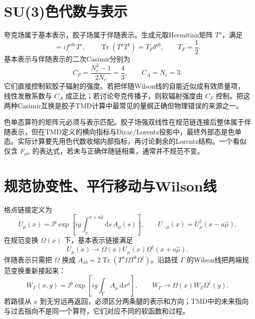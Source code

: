 \documentclass[UTF8,12pt,a4paper,twoside,openany]{ctexbook}
\newcommand{\dd}{\mathrm{d}}
\newcommand{\Tr}{\operatorname{Tr}}
\begin{document}
\section{SU(3)色代数与表示}

夸克场属于基本表示，胶子场属于伴随表示。生成元取Hermitian矩阵 \(T^a\)，满足
\begin{equation}
  [T^a,T^b]=if^{abc}T^c,
  \qquad
  \Tr(T^aT^b)=T_F\delta^{ab},
  \qquad
  T_F=\frac12.
  \label{eq:toolbox-generators}
\end{equation}
基本表示与伴随表示的二次Casimir分别为
\begin{equation}
  C_F=\frac{N_c^2-1}{2N_c}=\frac43,
  \qquad
  C_A=N_c=3.
  \label{eq:toolbox-casimir}
\end{equation}
它们直接控制软胶子辐射的强度。若把伴随Wilson线的自能近似成有效质量项，线性发散系数与 \(C_A\) 成正比；若讨论夸克传播子，则软辐射强度由 \(C_F\) 控制。把这两种Casimir互换是胶子TMD计算中最常见的量纲正确但物理错误的来源之一。

色单态算符的矩阵元必须与表示匹配。胶子场强双线性在规范链连接后整体属于伴随表示，但在TMD定义的横向指标与Dirac/Lorentz投影中，最终外部态是色单态。实际计算要先用色代数收缩内部指标，再讨论剩余的Lorentz结构。一个看似仅含 \(F_{\mu\nu}\) 的表达式，若未与正确伴随链相乘，通常并不规范不变。

\section{规范协变性、平行移动与Wilson线}

格点链接定义为
\begin{equation}
  U_\mu(x)=\mathcal P\exp\left[ig\int_x^{x+a\hat\mu}\dd s\,A_\mu(s)\right],
  \qquad
  U_{-\mu}(x)=U_\mu^\dagger(x-a\hat\mu).
  \label{eq:toolbox-linkdef}
\end{equation}
在规范变换 \(\Omega(x)\) 下，基本表示链接满足
\begin{equation}
  U_\mu(x)\to \Omega(x)U_\mu(x)\Omega^\dagger(x+a\hat\mu).
  \label{eq:toolbox-linkgauge}
\end{equation}
伴随表示只需把 \(\Omega\) 换成 \(A_{ab}=2\Tr(T^a\Omega T^b\Omega^\dagger)\)。沿路径 \(\Gamma\) 的Wilson线把两端规范变换重新接起来：
\begin{equation}
  W_\Gamma(x,y)=\mathcal P\exp\left[ig\int_\Gamma A_\mu\,\dd x^\mu\right],
  \qquad
  W_\Gamma\to\Omega(x)W_\Gamma\Omega^\dagger(y).
  \label{eq:toolbox-wilsonline}
\end{equation}
若路径从 \(x\) 到无穷远再返回，必须区分两条腿的表示和方向；TMD中的未来指向与过去指向不是同一个算符，它们对应不同的软函数和过程。
\end{document}
